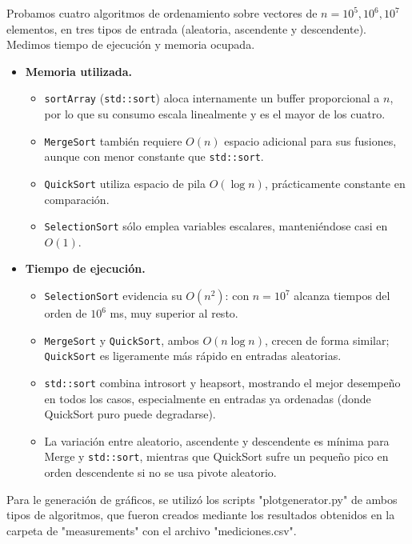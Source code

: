 Probamos cuatro algoritmos de ordenamiento sobre vectores de \(n=10^5,10^6,10^7\) elementos, en tres tipos de entrada (aleatoria, ascendente y descendente). Medimos tiempo de ejecución y memoria ocupada.

\begin{itemize}
  \item \textbf{Memoria utilizada.}  
    \begin{itemize}
      \item \texttt{sortArray} (\texttt{std::sort}) aloca internamente un buffer proporcional a \(n\), por lo que su consumo escala linealmente y es el mayor de los cuatro.  
      \item \texttt{MergeSort} también requiere \(O(n)\) espacio adicional para sus fusiones, aunque con menor constante que \texttt{std::sort}.  
      \item \texttt{QuickSort} utiliza espacio de pila \(O(\log n)\), prácticamente constante en comparación.  
      \item \texttt{SelectionSort} sólo emplea variables escalares, manteniéndose casi en \(O(1)\).  
    \end{itemize}
 
  
  \item \textbf{Tiempo de ejecución.}  
    \begin{itemize}
      \item \texttt{SelectionSort} evidencia su \(O(n^2)\): con \(n=10^7\) alcanza tiempos del orden de \(10^6\) ms, muy superior al resto.  
      \item \texttt{MergeSort} y \texttt{QuickSort}, ambos \(O(n\log n)\), crecen de forma similar; \texttt{QuickSort} es ligeramente más rápido en entradas aleatorias.  
      \item \texttt{std::sort} combina introsort y heapsort, mostrando el mejor desempeño en todos los casos, especialmente en entradas ya ordenadas (donde QuickSort puro puede degradarse).  
      \item La variación entre aleatorio, ascendente y descendente es mínima para Merge y \texttt{std::sort}, mientras que QuickSort sufre un pequeño pico en orden descendente si no se usa pivote aleatorio.  
    \end{itemize}
\end{itemize}

Para le generación de gráficos, se utilizó los scripts "plotgenerator.py" de ambos tipos de algoritmos, que fueron creados mediante los resultados obtenidos en la carpeta de "measurements" con el archivo "mediciones.csv".



